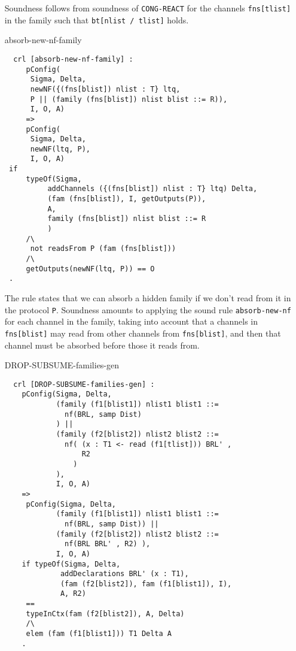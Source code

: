 \documentclass{article}
\begin{document}
\begin{itemize}
  Soundness follows from soundness of \texttt{CONG-REACT} for the
  channels  \texttt{fns[tlist]} in the family such that
  \texttt{bt[nlist / tlist]} holds.
  
  \item[absorb-new-nf-family]
  
  \begin{lstlisting}
  crl [absorb-new-nf-family] : 
     pConfig(
      Sigma, Delta, 
      newNF({(fns[blist]) nlist : T} ltq, 
      P || (family (fns[blist]) nlist blist ::= R)), 
      I, O, A) 
     => 
     pConfig(
      Sigma, Delta, 
      newNF(ltq, P), 
      I, O, A) 
 if 
     typeOf(Sigma, 
          addChannels ({(fns[blist]) nlist : T} ltq) Delta, 
          (fam (fns[blist]), I, getOutputs(P)), 
          A, 
          family (fns[blist]) nlist blist ::= R
          )
     /\ 
      not readsFrom P (fam (fns[blist]))
     /\ 
     getOutputs(newNF(ltq, P)) == O        
 .
  \end{lstlisting}
  
  The rule states that we can absorb a hidden family if we don't read from it 
  in the protocol \texttt{P}. Soundness amounts to applying the sound rule
  \texttt{absorb-new-nf} for each channel in the family, taking
  into account that a channels in \texttt{fns[blist]} may read from other 
  channels from \texttt{fns[blist]}, and then that channel must be
  absorbed before those it reads from.
  
  \item[DROP-SUBSUME-families-gen]
  
  \begin{lstlisting}
  crl [DROP-SUBSUME-families-gen] :
    pConfig(Sigma, Delta,
            (family (f1[blist1]) nlist1 blist1 ::= 
              nf(BRL, samp Dist)
            ) || 
            (family (f2[blist2]) nlist2 blist2 ::= 
              nf( (x : T1 <- read (f1[tlist])) BRL' , 
                  R2
                ) 
            ),
            I, O, A) 
    =>           
     pConfig(Sigma, Delta,
            (family (f1[blist1]) nlist1 blist1 ::= 
              nf(BRL, samp Dist)) || 
            (family (f2[blist2]) nlist2 blist2 ::= 
              nf(BRL BRL' , R2) ),
            I, O, A) 
    if typeOf(Sigma, Delta, 
             addDeclarations BRL' (x : T1), 
             (fam (f2[blist2]), fam (f1[blist1]), I), 
             A, R2) 
     == 
     typeInCtx(fam (f2[blist2]), A, Delta)
     /\
     elem (fam (f1[blist1])) T1 Delta A
    .
  \end{lstlisting}
  

\end{itemize}
\end{document}
